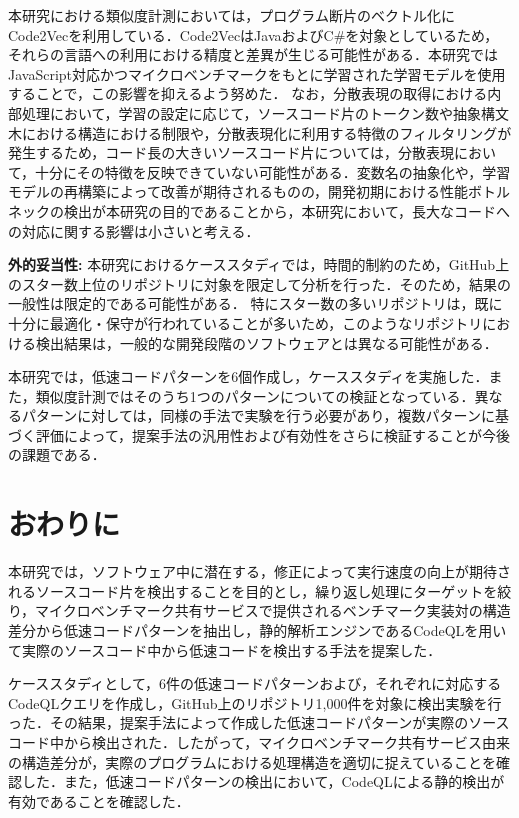 \documentclass[submit,techrep,noauthor]{ipsj}
\begin{document}
本研究における類似度計測においては，プログラム断片のベクトル化にCode2Vecを利用している．Code2VecはJavaおよびC\#を対象としているため，それらの言語への利用における精度と差異が生じる可能性がある．本研究ではJavaScript対応かつマイクロベンチマークをもとに学習された学習モデル\cite{saiki}を使用することで，この影響を抑えるよう努めた．
なお，分散表現の取得における内部処理において，学習の設定に応じて，ソースコード片のトークン数や抽象構文木における構造における制限や，分散表現化に利用する特徴のフィルタリングが発生するため，コード長の大きいソースコード片については，分散表現において，十分にその特徴を反映できていない可能性がある．変数名の抽象化や，学習モデルの再構築によって改善が期待されるものの，開発初期における性能ボトルネックの検出が本研究の目的であることから，本研究において，長大なコードへの対応に関する影響は小さいと考える．

\noindent\textbf{外的妥当性:}
本研究におけるケーススタディでは，時間的制約のため，GitHub上のスター数上位のリポジトリに対象を限定して分析を行った．そのため，結果の一般性は限定的である可能性がある．
特にスター数の多いリポジトリは，既に十分に最適化・保守が行われていることが多いため，このようなリポジトリにおける検出結果は，一般的な開発段階のソフトウェアとは異なる可能性がある．

本研究では，低速コードパターンを6個作成し，ケーススタディを実施した．また，類似度計測ではそのうち1つのパターンについての検証となっている．異なるパターンに対しては，同様の手法で実験を行う必要があり，複数パターンに基づく評価によって，提案手法の汎用性および有効性をさらに検証することが今後の課題である．


\section{おわりに}
\label{sec:summary}

本研究では，ソフトウェア中に潜在する，修正によって実行速度の向上が期待されるソースコード片を検出することを目的とし，繰り返し処理にターゲットを絞り，マイクロベンチマーク共有サービスで提供されるベンチマーク実装対の構造差分から低速コードパターンを抽出し，静的解析エンジンであるCodeQLを用いて実際のソースコード中から低速コードを検出する手法を提案した．

ケーススタディとして，6件の低速コードパターンおよび，それぞれに対応するCodeQLクエリを作成し，GitHub上のリポジトリ1,000件を対象に検出実験を行った．その結果，提案手法によって作成した低速コードパターンが実際のソースコード中から検出された．したがって，マイクロベンチマーク共有サービス由来の構造差分が，実際のプログラムにおける処理構造を適切に捉えていることを確認した．また，低速コードパターンの検出において，CodeQLによる静的検出が有効であることを確認した．
\end{document}
